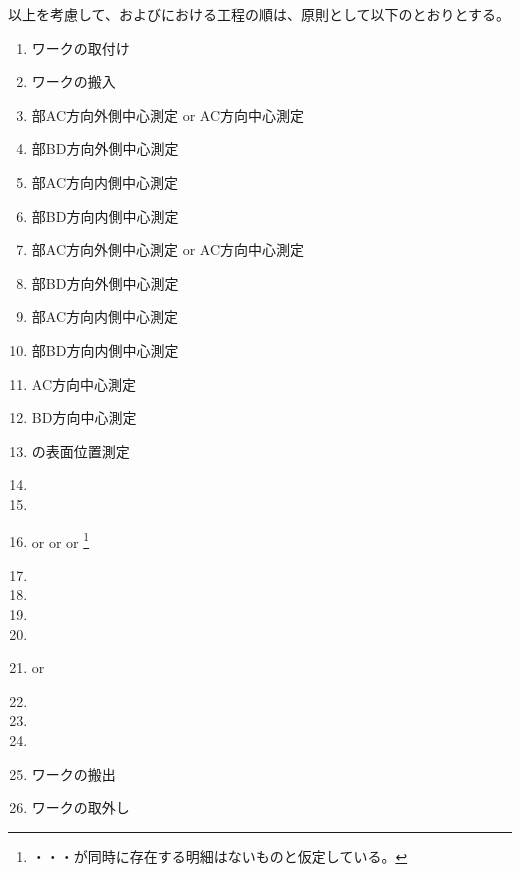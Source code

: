 \clearpage
以上を考慮して、\DMC および\MMC における工程の順は、原則として以下のとおりとする。
\begin{enumerate}[label={\arabic*.}]
\item ワークの取付け
\item ワークの搬入
\item \BottomEndFace 部AC方向外側中心測定 or \BottomOutcut AC方向中心測定
\item \BottomEndFace 部BD方向外側中心測定
\item \BottomEndFace 部AC方向内側中心測定
\item \BottomEndFace 部BD方向内側中心測定
\item \TopEndFace 部AC方向外側中心測定 or \TopOutcut AC方向中心測定
\item \TopEndFace 部BD方向外側中心測定
\item \TopEndFace 部AC方向内側中心測定
\item \TopEndFace 部BD方向内側中心測定
\item \Keyway AC方向中心測定
\item \Keyway BD方向中心測定
\item \Dimple の表面位置測定
\item \DimpleMilling
\item \TopEndFacecutMilling
\item \TopOutcutMilling or \TopCurvedOutcutMilling or \EndFaceBoringMilling or \IncutBoringMilling
\footnote{\TopOutcut・\TopCurvedOutcutMilling・\EndFaceBoring・\IncutBoring が同時に存在する明細はないものと仮定している。}
\item \KeywayMilling
\item \TopEndFaceOutCChamferMilling
\item \TopEndFaceInCChamferMilling
\item \BottomEndFacecutMilling
\item \BottomOutcutMilling or \BottomCurvedOutcutMilling
\item \BottomEndFaceOutCChamferMilling
\item \BottomEndFaceInCChamferMilling
\item \CenterlineEndFaceDifMeasurement
\item ワークの搬出
\item ワークの取外し
\end{enumerate}
